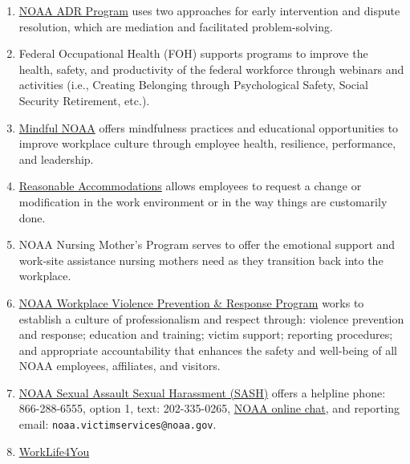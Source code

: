 \documentclass[
  letterpaper,
  DIV=11,
  numbers=noendperiod]{scrreprt}
\begin{document}
\begin{enumerate}
\def\labelenumi{\alph{enumi}.}
\item
  \href{https://www.noaa.gov/organization/administration/nao-202-715-noaa-alternate-dispute-resolution-program}{NOAA
  ADR Program} uses two approaches for early intervention and dispute
  resolution, which are mediation and facilitated problem-solving.
\item
  Federal Occupational Health (FOH) supports programs to improve the
  health, safety, and productivity of the federal workforce through
  webinars and activities (i.e., Creating Belonging through
  Psychological Safety, Social Security Retirement, etc.).
\item
  \href{https://sites.google.com/noaa.gov/mindful-noaa-collaboration/home?authuser=0}{Mindful
  NOAA} offers mindfulness practices and educational opportunities to
  improve workplace culture through employee health, resilience,
  performance, and leadership.
\item
  \href{https://sites.google.com/noaa.gov/ohcs/employee-resources/work-life-resources/workplace-programs/reasonable-accommodations}{Reasonable
  Accommodations} allows employees to request a change or modification
  in the work environment or in the way things are customarily done.
\item
  NOAA Nursing Mother's Program serves to offer the emotional support
  and work-site assistance nursing mothers need as they transition back
  into the workplace.
\item
  \href{https://www.noaa.gov/workplace-violence-prevention-response-program}{NOAA
  Workplace Violence Prevention \& Response Program} works to establish
  a culture of professionalism and respect through: violence prevention
  and response; education and training; victim support; reporting
  procedures; and appropriate accountability that enhances the safety
  and well-being of all NOAA employees, affiliates, and visitors.
\item
  \href{https://www.noaa.gov/organization/administration/nao-202-1106-noaa-sexual-assault-and-sexual-harassment-prevention-and}{NOAA
  Sexual Assault Sexual Harassment (SASH)} offers a helpline phone:
  866-288-6555, option 1, text: 202-335-0265,
  \href{https://noaasashhelpline.org/}{NOAA online chat}, and reporting
  email: \texttt{noaa.victimservices@noaa.gov}.
\item
  \href{https://sites.google.com/noaa.gov/ohcs/employee-resources/work-life-resources/workplace-programs/worklife4you}{WorkLife4You}

\end{enumerate}
\end{document}
